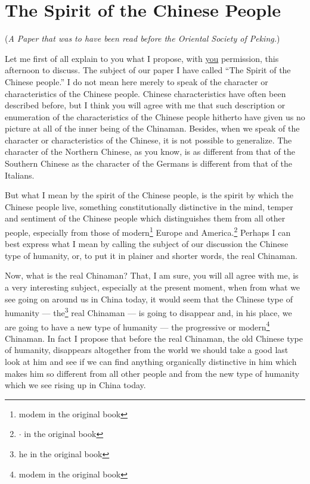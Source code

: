\chapter{The Spirit of the Chinese People}
\begin{center} \footnotesize
    (\emph{A Paper that was to have been read before the Oriental Society of Peking.})
\end{center}

Let me first of all explain to you what I propose, with \underline{you} permission, this afternoon to discuss.
The subject of our paper I have called ``The Spirit of the Chinese people.''
I do not mean here merely to speak of the character or characteristics of the Chinese people.
Chinese characteristics have often been described before, but I think you will agree with me that such description or enumeration of the characteristics of the Chinese people hitherto have given us no picture at all of the inner being of the Chinaman.
Besides, when we speak of the character or characteristics of the Chinese, it is not possible to generalize.
The character of the Northern Chinese, as you know, is as different from that of the Southern Chinese as the character of the Germans is different from that of the Italians.

But what I mean by the spirit of the Chinese people, is the spirit by which the Chinese people live, something constitutionally distinctive in the mind, temper and sentiment of the Chinese people which distinguishes them from all other people, especially from those of modern\footnote{modem in the original book} Europe and America.\footnote{{\huge$\cdot$} in the original book}
Perhaps I can best express what I mean by calling the subject of our discussion the Chinese type of humanity, or, to put it in plainer and shorter words, the real Chinaman.

Now, what is the real Chinaman? 
That, I am sure, you will all agree with me, is a very interesting subject, especially at the present moment, when from what we see going on around us in China today, it would seem that the Chinese type of humanity --- the\footnote{he in the original book} real Chinaman --- is going to disappear and, in his place, we are going to have a new type of humanity --- the progressive or modern\footnote{modem in the original book} Chinaman.
In fact I propose that before the real Chinaman, the old Chinese type of humanity, disappears altogether from the world we should take a good last look at him and see if we can find anything organically distinctive in him which makes him so different from all other people and from the new type of humanity which we see rising up in China today.

